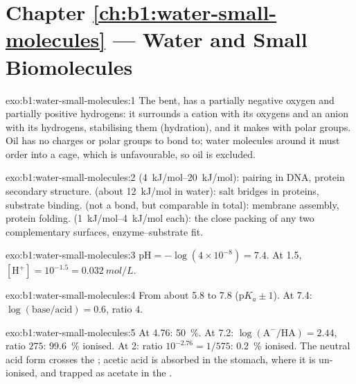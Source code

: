 \section*{Chapter \ref{ch:b1:water-small-molecules} --- Water and Small Biomolecules}

\begin{solution}{exo:b1:water-small-molecules:1}
The bent,  has a partially negative oxygen and partially
positive hydrogens: it surrounds a cation with its oxygens and an anion
with its hydrogens, stabilising them (hydration), and it makes  with polar groups. Oil has no charges or polar groups to bond to;
water molecules around it must order into a cage, which is unfavourable,
so oil is excluded.
\end{solution}

\begin{solution}{exo:b1:water-small-molecules:2}
 (\qtyrange{4}{20}{kJ/mol}):  pairing in DNA, protein
secondary structure.  (about \qty{12}{kJ/mol} in water): salt
bridges in proteins, substrate binding.  (not a bond,
but comparable in total): membrane assembly, protein folding.  (\qtyrange{1}{4}{kJ/mol} each): the close packing of any two
complementary surfaces, enzyme--substrate fit.
\end{solution}

\begin{solution}{exo:b1:water-small-molecules:3}
$\mathrm{pH} = -\log(4\times 10^{-8}) = 7.4$. At  1.5,
$[\mathrm{H^+}] = 10^{-1.5} = \qty{0.032}{mol/L}$.
\end{solution}

\begin{solution}{exo:b1:water-small-molecules:4}
From about 5.8 to 7.8 (p$K_a \pm 1$). At 7.4: $\log(\text{base}/\text{acid})
= 0.6$, ratio $4$.
\end{solution}

\begin{solution}{exo:b1:water-small-molecules:5}
At  4.76: \qty{50}{\%}. At 7.2: $\log(\mathrm{A^-}/\mathrm{HA}) =
2.44$, ratio $275$: \qty{99.6}{\%} ionised. At  2: ratio $10^{-2.76} =
1/575$: \qty{0.2}{\%} ionised. The neutral acid form crosses the ; acetic acid is absorbed in the stomach, where it is
un-ionised, and trapped as acetate in the .
\end{solution}

